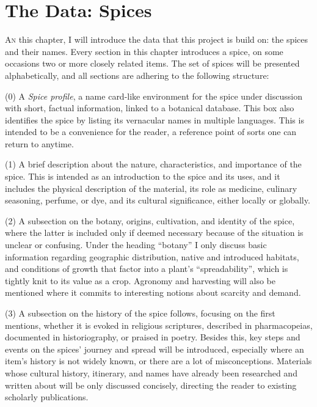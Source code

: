 \chapter{The Data: Spices}
\label{ch:data}

\lettrine[lines=\iniciale]{\textcolor{\accentcolor}{A}}{n} this chapter, I will  introduce the data that this project is build on: the spices and their names. Every section in this chapter introduces a spice, on some occasions two or more closely related items. The set of spices will be presented alphabetically, and all sections are adhering to the following structure: 

(0) A \textit{Spice profile}, a name card-like environment for the spice under discussion with short, factual information, linked to a botanical database. This box also identifies the spice by listing its vernacular names in multiple languages. This is intended to be a convenience for the reader, a reference point of sorts one can return to anytime.

(1) A brief description about the nature, characteristics, and importance of the spice. This is intended as an introduction to the spice and its uses, and it includes the physical description of the material, its role as medicine, culinary seasoning, perfume, or dye, and its cultural significance, either locally or globally. 

(2) A subsection on the botany, origins, cultivation, and identity of the spice, where the latter is included only if deemed necessary because of the situation is unclear or confusing. Under the heading ``botany'' I only discuss basic information regarding geographic distribution, native and introduced habitats, and conditions of growth that factor into a plant's ``spreadability'', which is tightly knit to its value as a crop. Agronomy and harvesting will also be mentioned where it commits to interesting notions about scarcity and demand.

(3) A subsection on the history of the spice follows, focusing on the first mentions, whether it is evoked in religious scriptures, described in pharmacopeias, documented in historiography, or praised in poetry. Besides this, key steps and events on the spices' journey and spread will be introduced, especially where an item's history is not widely known, or there are a lot of misconceptions. Materials whose cultural history, itinerary, and names have already been researched and written about will be only discussed concisely, directing the reader to existing scholarly publications. 


